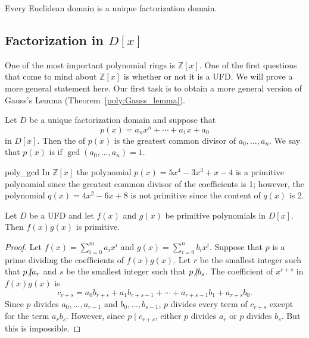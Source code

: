 \begin{corollary}
Every Euclidean domain is a unique factorization domain.
\end{corollary}


\subsection*{Factorization in $D[x]$}

One of the most important polynomial rings is ${\mathbb Z}[x]$.  One of the first questions that come to mind about ${\mathbb Z}[x]$ is whether or not it is a UFD.  We will prove a more general statement here.  Our first task is to obtain a more general version of Gauss's Lemma
(Theorem~\ref{poly:Gauss_lemma}).  

Let $D$ be a unique factorization domain and suppose that 
\[
p(x) = a_n x^n + \cdots + a_1 x + a_0
\]
in $D[x]$.  Then the  of $p(x)$ is the greatest common divisor of $a_0, \ldots, a_n$.  We say
that $p(x)$ is  if $\gcd(a_0, \ldots, a_n ) = 1$.    


 
\begin{example}{poly_gcd}
In ${\mathbb Z}[x]$ the polynomial $p(x)= 5 x^4 - 3 x^3 + x -4$ is a primitive polynomial since the greatest common divisor of the
coefficients is 1; however, the polynomial $q(x) = 4 x^2 - 6 x + 8$ is not primitive since the content of $q(x)$ is 2.
\end{example}
 
\begin{theorem}\label{domains:Gauss_lemma}
Let $D$ be a UFD and let $f(x)$ and $g(x)$ be primitive polynomials in $D[x]$.  Then $f(x) g(x)$ is primitive.
\end{theorem}
 
\begin{proof}
Let $f(x) = \sum_{i=0}^{m} a_i x^i$ and $g(x) = \sum_{i=0}^{n} b_i x^i$.  Suppose that $p$ is a prime dividing the coefficients of $f(x)
g(x)$.  Let $r$ be the smallest integer such that $p {\not{\mid}} a_r$ and $s$ be the smallest integer such that $p {\not{\mid}} b_s$.  The
coefficient of $x^{r+s}$ in $f(x) g(x)$ is 
\[
c_{r+s} = a_0 b_{r+s} + a_1 b_{r+s-1} + \cdots + a_{r+s-1} b_1 +
a_{r+s} b_0. 
\]
Since $p$ divides $a_0, \ldots, a_{r-1}$ and $b_0, \ldots, b_{s-1}$, $p$ divides every term of $c_{r+s}$ except for the term $a_r b_s$.  However, since $p \mid c_{r+s}$, either $p$ divides $a_r$ or $p$ divides $b_s$. But this is impossible.
\end{proof}
 

